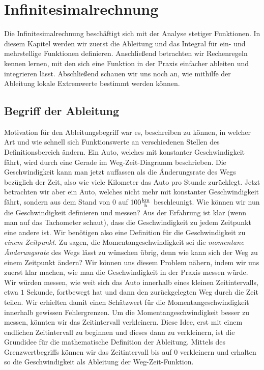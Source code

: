 \chapter{Infinitesimalrechnung}

Die Infinitesimalrechnung beschäftigt sich mit der Analyse stetiger Funktionen. In diesem Kapitel werden wir zuerst die Ableitung und das Integral für ein- und mehrstellige Funktionen definieren. Anschließend betrachten wir Rechenregeln kennen lernen, mit den sich eine Funktion in der Praxis einfacher ableiten und integrieren lässt. Abschließend schauen wir uns noch an, wie mithilfe der Ableitung lokale Extremwerte bestimmt werden können.

\section{Begriff der Ableitung}

Motivation für den Ableitungsbegriff war es, beschreiben zu können, in welcher Art und wie schnell sich Funktionswerte an verschiedenen Stellen des Definitionsbereich ändern. Ein Auto, welches mit konstanter Geschwindigkeit fährt,  wird durch eine Gerade im Weg-Zeit-Diagramm beschrieben. Die Geschwindigkeit kann man jetzt auffassen als die Änderungsrate des Wegs bezüglich der Zeit, also wie viele Kilometer das Auto pro Stunde zurücklegt. Jetzt betrachten wir aber ein Auto, welches nicht mehr mit konstanter Geschwindigkeit fährt, sondern aus dem Stand von $0$ auf $100 \frac{\text{km}}{\text{h}}$ beschleunigt. Wie können wir nun die Geschwindigkeit definieren und messen? Aus der Erfahrung ist klar (wenn man auf das Tachometer schaut), dass die Geschwindigkeit zu jedem Zeitpunkt eine andere ist. Wir benötigen also eine Definition für die Geschwindigkeit zu \emph{einem Zeitpunkt}. Zu sagen, die Momentangeschwindigkeit sei die \emph{momentane Änderungsrate} des Wegs lässt zu wünschen übrig, denn wie kann sich der Weg zu einem Zeitpunkt ändern? Wir können uns diesem Problem nähern, indem wir uns zuerst klar machen, wie man die Geschwindigkeit in der Praxis messen würde. Wir würden messen, wie weit sich das Auto innerhalb eines kleinen Zeitintervalls, etwa $1$ Sekunde, fortbewegt hat und dann den zurückgelegten Weg durch die Zeit teilen. Wir erhielten damit einen Schätzwert für die Momentangeschwindigkeit innerhalb gewissen Fehlergrenzen. Um die Momentangeschwindigkeit besser zu messen, könnten wir das Zeitintervall verkleinern. Diese Idee, erst mit einem endlichen Zeitintervall zu beginnen und dieses dann zu verkleinern, ist die Grundidee für die mathematische Definition der Ableitung. Mittels des Grenzwertbegriffs können wir das Zeitintervall bis auf $0$ verkleinern und erhalten so die Geschwindigkeit als Ableitung der Weg-Zeit-Funktion.

